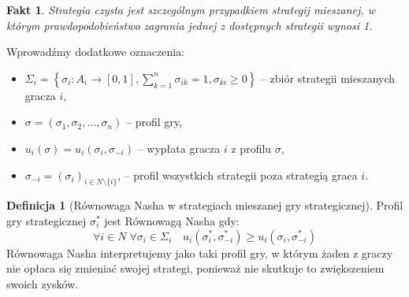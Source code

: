 \documentclass[inzynierska]{pwr_wmat_praca_dyplomowa}
\theoremstyle{plain}
\numberwithin{theorem}{chapter}
\newtheorem{fact}[theorem]{Fakt}
\theoremstyle{definition}
\numberwithin{theorem}{chapter}
\newtheorem{definition}[theorem]{Definicja}
\begin{document}
	\begin{fact}
		Strategia czysta jest szczególnym przypadkiem strategij mieszanej, w którym prawdopodobieństwo zagrania jednej z dostępnych strategii wynosi 1.
	\end{fact}
	Wprowadźmy dodatkowe oznaczenia:
 	\begin{itemize}
 		\item $\Sigma_i  = \left\{ \sigma_i: A_i \rightarrow [0,1],\displaystyle\sum_{k=1}^{n} \sigma_{ik} = 1, \sigma_{ki}\ge 0 \right\}$ -- zbiór strategii mieszanych gracza $i$,
 		\item  $\sigma = (\sigma_1, \sigma_2,\dots,\sigma_n)$ -- profil gry,
 		\item $u_i(\sigma) = u_i(\sigma_i,\sigma_{-i})$ -- wypłata gracza $i$ z profilu $\sigma$,
 		\item $\sigma_{-i} = (\sigma_i)_{i\in N \setminus \{i\}}$, -- profil wszystkich strategii poza strategią graca $i$. 
 	\end{itemize}
	\begin{definition}[Równowaga Nasha w strategiach mieszanej gry strategicznej]
		Profil gry strategicznej $\sigma_i^*$ jest Równowagą Nasha gdy:
		\begin{equation*}
			\mathop{\forall}{i \in N}\;
			\mathop{\forall}{\sigma_i \in \Sigma_i} \quad
			u_i(\sigma_i^*,\sigma_{-i}^*) \ge u_i(\sigma_i, \sigma_{-i}^*)
		\end{equation*}
	Równowaga Nasha interpretujemy jako taki profil gry, w którym żaden z graczy nie opłaca się zmieniać swojej strategi, ponieważ nie skutkuje to zwiększeniem swoich zysków.
	\end{definition}
\end{document}
